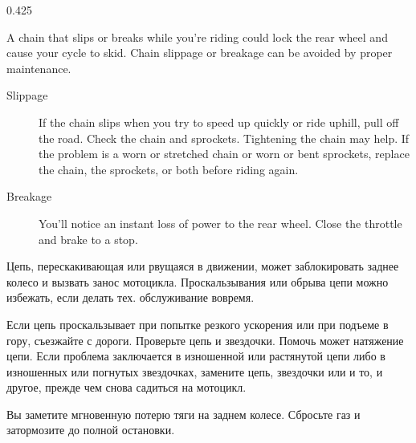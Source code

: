 \begin{langblock}{0.425}
	\begin{eng}
	
	A chain that slips or breaks while you're riding could lock the rear wheel and cause your cycle to skid.  Chain slippage or breakage can be avoided by proper maintenance.
	
	\begin{description}
		\item[Slippage] If the chain slips when you try to speed up quickly or ride uphill, pull off the road. Check the chain and sprockets. Tightening the chain may help. If the problem is a worn or stretched chain or worn or bent sprockets, replace the chain, the sprockets, or both before riding again.
		\item[Breakage] You'll notice an instant loss of power to the rear wheel.  Close the throttle and brake to a stop.
	\end{description}
	\end{eng}
	\begin{rus}
		
		Цепь, перескакивающая или рвущаяся в движении, может заблокировать заднее колесо и вызвать занос мотоцикла. Проскальзывания или обрыва цепи можно избежать, если делать тех. обслуживание вовремя.
		
		\begin{description}[noitemsep]
			\item[Проскальзывание] Если цепь проскальзывает при попытке резкого ускорения или при подъеме в гору, съезжайте с дороги. Проверьте цепь и звездочки. Помочь может натяжение цепи. Если проблема заключается в изношенной или растянутой цепи либо в изношенных или погнутых звездочках, замените цепь, звездочки или и то, и другое, прежде чем снова садиться на мотоцикл.
			\item[Разрыв] Вы заметите мгновенную потерю тяги на заднем колесе.  Сбросьте газ и затормозите до полной остановки.
		\end{description}
\end{rus}
\end{langblock}



